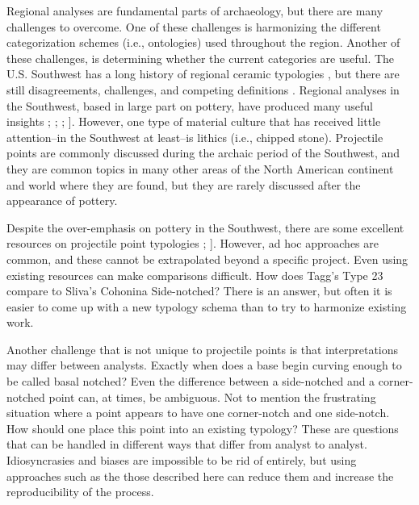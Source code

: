 \documentclass[a4paper]{article}
\begin{document}
Regional analyses are fundamental parts of archaeology, but there are many challenges to overcome. One of these challenges is harmonizing the different categorization schemes (i.e., ontologies) used throughout the region. Another of these challenges, is determining whether the current categories are useful. The U.S. Southwest has a long history of regional ceramic typologies \autocites[e.g.,][]{Colton1956-zy,gladwin1930a,Hargrave1932-ng,Kidder1915-ae,Martin1940-jg}, but there are still disagreements, challenges, and competing definitions \autocite{Duff1996-au}. Regional analyses in the Southwest, based in large part on pottery, have produced many useful insights \autocites[e.g.,][]{Bernardini2005-ue,Clark2019-bz}; \textcite{Hegmon2016-xw}; \textcite{Mills2013-wq}; \textcite{Peeples2018-ib}{]}. However, one type of material culture that has received little attention--in the Southwest at least--is lithics (i.e., chipped stone). Projectile points are commonly discussed during the archaic period of the Southwest, and they are common topics in many other areas of the North American continent and world where they are found, but they are rarely discussed after the appearance of pottery.

Despite the over-emphasis on pottery in the Southwest, there are some excellent resources on projectile point typologies \autocites[e.g.,][]{Hoffman1997-hb,Justice2002-cf,Loendorf2004-tp}; \textcite{Sliva2006-nq}{]}. However, ad hoc approaches are common, and these cannot be extrapolated beyond a specific project. Even using existing resources can make comparisons difficult. How does Tagg's \autocite*[p.111]{Tagg1994-wi} Type 23 compare to Sliva's \autocite[p.~35]{Sliva2006-nq} Cohonina Side-notched? There is an answer, but often it is easier to come up with a new typology schema than to try to harmonize existing work.

Another challenge that is not unique to projectile points is that interpretations may differ between analysts. Exactly when does a base begin curving enough to be called basal notched? Even the difference between a side-notched and a corner-notched point can, at times, be ambiguous. Not to mention the frustrating situation where a point appears to have one corner-notch and one side-notch. How should one place this point into an existing typology? These are questions that can be handled in different ways that differ from analyst to analyst. Idiosyncrasies and biases are impossible to be rid of entirely, but using approaches such as the those described here can reduce them and increase the reproducibility of the process.
\end{document}
